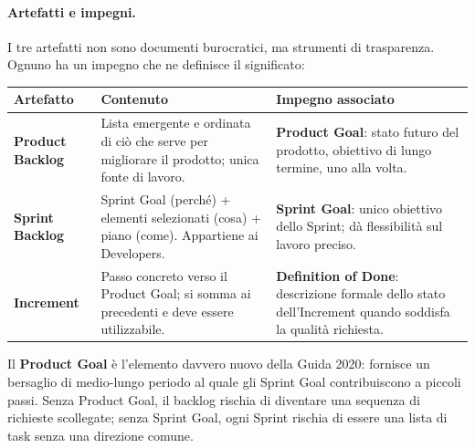 \documentclass[12pt]{extarticle}
\begin{document}
\paragraph{Artefatti e impegni.}
I tre artefatti non sono documenti burocratici, ma strumenti di trasparenza. Ognuno ha un impegno che ne definisce il significato:

\begin{center}
\small
\begin{tabular}{p{3.4cm}p{6.0cm}p{6.0cm}}
    \toprule
    \textbf{Artefatto} & \textbf{Contenuto} & \textbf{Impegno associato} \\
    \midrule
    \textbf{Product Backlog} & Lista emergente e ordinata di ciò che serve per migliorare il prodotto; unica fonte di lavoro. & \textbf{Product Goal}: stato futuro del prodotto, obiettivo di lungo termine, uno alla volta. \\
    \addlinespace
    \textbf{Sprint Backlog} & Sprint Goal (perché) + elementi selezionati (cosa) + piano (come). Appartiene ai Developers. & \textbf{Sprint Goal}: unico obiettivo dello Sprint; dà flessibilità sul lavoro preciso. \\
    \addlinespace
    \textbf{Increment} & Passo concreto verso il Product Goal; si somma ai precedenti e deve essere utilizzabile. & \textbf{Definition of Done}: descrizione formale dello stato dell'Increment quando soddisfa la qualità richiesta. \\
    \bottomrule
\end{tabular}
\end{center}

\noindent Il \textbf{Product Goal} è l'elemento davvero nuovo della Guida 2020: fornisce un bersaglio di medio-lungo periodo al quale gli Sprint Goal contribuiscono a piccoli passi. Senza Product Goal, il backlog rischia di diventare una sequenza di richieste scollegate; senza Sprint Goal, ogni Sprint rischia di essere una lista di task senza una direzione comune.
\end{document}
